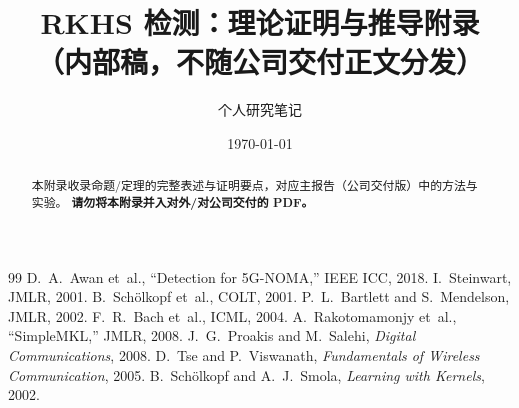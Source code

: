 \documentclass[12pt,a4paper,openany]{ctexrep}
\title{\textbf{RKHS 检测：理论证明与推导附录}\\（内部稿，不随公司交付正文分发）}
\author{个人研究笔记}
\date{\today}
\begin{document}
\maketitle
\begin{abstract}
\noindent
本附录收录命题/定理的完整表述与证明要点，对应主报告（公司交付版）中的方法与实验。
\textbf{请勿将本附录并入对外/对公司交付的 PDF。}
\end{abstract}
\tableofcontents
\clearpage


\begin{thebibliography}{99}
 D.~A.~Awan et~al., ``Detection for 5G-NOMA,'' IEEE ICC, 2018.
 I.~Steinwart, JMLR, 2001.
 B.~Sch{\"o}lkopf et~al., COLT, 2001.
 P.~L.~Bartlett and S.~Mendelson, JMLR, 2002.
 F.~R.~Bach et~al., ICML, 2004.
 A.~Rakotomamonjy et~al., ``SimpleMKL,'' JMLR, 2008.
 J.~G.~Proakis and M.~Salehi, \textit{Digital Communications}, 2008.
 D.~Tse and P.~Viswanath, \textit{Fundamentals of Wireless Communication}, 2005.
 B.~Sch{\"o}lkopf and A.~J.~Smola, \textit{Learning with Kernels}, 2002.
\end{thebibliography}
\end{document}
